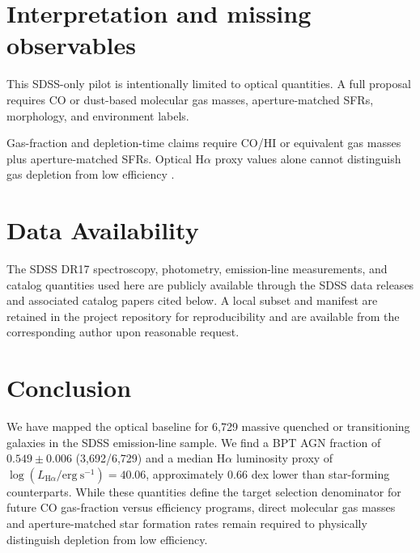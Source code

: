 \documentclass[twocolumn]{aastex631}
\begin{document}
\section{Interpretation and missing observables}\label{sec:missing}
This SDSS-only pilot is intentionally limited to optical quantities. A full proposal requires CO or dust-based molecular gas masses, aperture-matched SFRs, morphology, and environment labels.

Gas-fraction and depletion-time claims require CO/HI or equivalent gas masses plus aperture-matched SFRs. Optical H$\alpha$ proxy values alone cannot distinguish gas depletion from low efficiency \citep{coldgass1, coldgass2, xcoldgass2017, xgass2018}.


\section{Data Availability}\label{sec:data-avail}
The SDSS DR17 spectroscopy, photometry, emission-line measurements, and catalog quantities used here are publicly available through the SDSS data releases and associated catalog papers cited below. A local subset and manifest are retained in the project repository for reproducibility and are available from the corresponding author upon reasonable request.

\section{Conclusion}\label{sec:conclusion}
We have mapped the optical baseline for 6,729 massive quenched or transitioning galaxies in the SDSS emission-line sample. We find a BPT AGN fraction of $0.549 \pm 0.006$ (3,692/6,729) and a median H$\alpha$ luminosity proxy of $\log(L_{\mathrm{H}\alpha} / \mathrm{erg~s}^{-1}) = 40.06$, approximately 0.66 dex lower than star-forming counterparts. While these quantities define the target selection denominator for future CO gas-fraction versus efficiency programs, direct molecular gas masses and aperture-matched star formation rates remain required to physically distinguish depletion from low efficiency.
\end{document}
